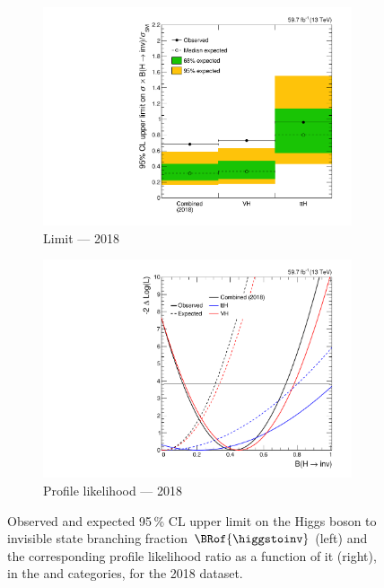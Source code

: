 \begin{figure}[htbp]
    \centering
    \begin{subfigure}[t]{0.45\textwidth}
        \includegraphics[width=\textwidth]{chapters/higgstoinv/figures/limits/per_year/limit_2018_comb.pdf}
        \caption{Limit --- 2018}
    \end{subfigure}
    \hspace{0.05\textwidth}
    \begin{subfigure}[t]{0.45\textwidth}
        \includegraphics[width=\textwidth]{chapters/higgstoinv/figures/likelihood_scan/profile_likelihood_scan_2018.pdf}
        \caption{Profile likelihood --- 2018}
    \end{subfigure}
    \caption[Observed and expected 95\,\% CL upper limit on the Higgs boson to invisible state branching fraction $\BRof{\higgstoinv}$ and the corresponding profile likelihood ratio as a function of it, in the \ttH and \VH categories, for the 2018 dataset]{Observed and expected 95\,\% CL upper limit on the Higgs boson to invisible state branching fraction $\BRof{\higgstoinv}$ (left) and the corresponding profile likelihood ratio as a function of it (right), in the \ttH and \VH categories, for the 2018 dataset.}
    \label{fig:htoinv_limit_likelihood_2018}
\end{figure}

